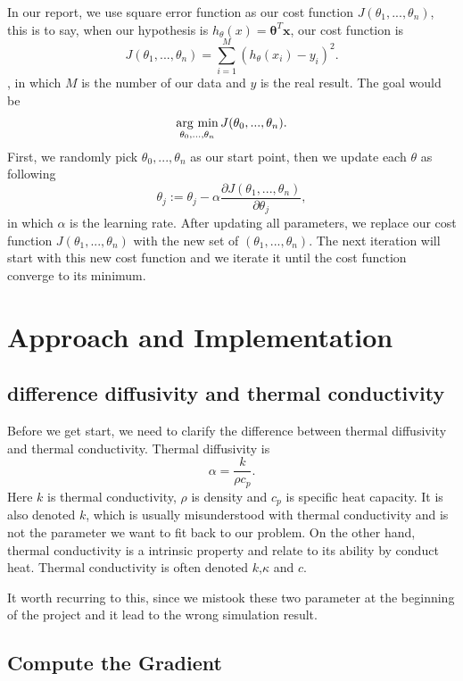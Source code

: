 \documentclass[10pt,a4paper]{report}
\newcommand{\argmin}{\mathop{\rm arg~min}\limits}
\begin{document}
In our report, we use square error function as our cost function $J(\theta_1,...,\theta_n)$, this is to say, when our hypothesis is $h_\theta(x)=\mathbf{\theta}^T \mathbf{x}$, our cost function is \[J(\theta_1,...,\theta_n)= \sum\limits_{i=1}^M (h_\theta(x_i)-y_i)^2          .\] 
, in which $M$ is the number of our data and $y$ is the real result. The goal would be \[\argmin_{\theta_0,...,\theta_n}J(\theta_0,...,\theta_n).\]  
First, we randomly pick $\theta_0,...,\theta_n$ as our start point, then we update each $\theta$ as following \[\theta_j := \theta_j - \alpha{\frac{\partial J(\theta_1,...,\theta_n)}{\partial \theta_j}},\] in which $\alpha$ is the learning rate. After updating all parameters, we replace our cost function $J(\theta_1,...,\theta_n)$ with the new set of $(\theta_1,...,\theta_n)$. The next iteration will start with this new cost function and we iterate it until the cost function converge to its minimum. 


\chapter{Approach and Implementation}
\section{difference diffusivity and thermal conductivity}

Before we get start, we need to clarify the difference between thermal diffusivity and thermal conductivity. Thermal diffusivity is \[\alpha = {\frac{k}{\rho c_p}}.\] Here $k$ is thermal conductivity, $\rho$ is density and $c_p$ is specific heat capacity. It is also denoted $k$, which is usually misunderstood with thermal conductivity and is not the parameter we want to fit back to our problem. On the other hand, thermal conductivity is a intrinsic property and relate to its ability by conduct heat. Thermal conductivity is often denoted $k$,$\kappa$ and $c$.   

It worth recurring to this, since we mistook these two parameter at the beginning of the project and it lead to the wrong simulation result.

\section{Compute the Gradient}
\end{document}
